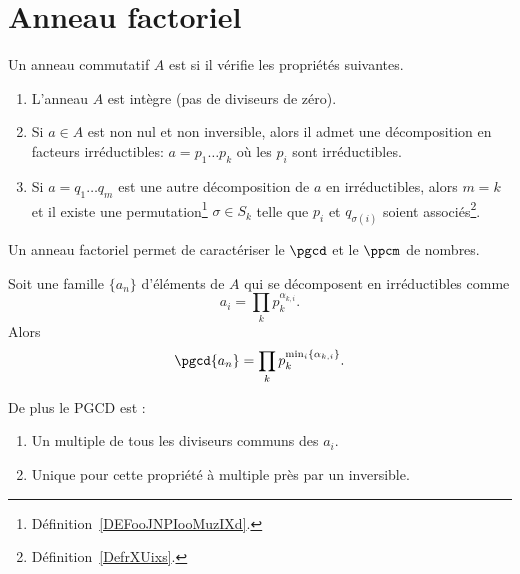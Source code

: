 \section{Anneau factoriel}

\begin{definition}        \label{DEFooVCATooPJGWKq}
	Un anneau commutatif \( A\) est  si il vérifie les propriétés suivantes.
	\begin{enumerate}
		\item
		      L'anneau \( A\) est intègre (pas de diviseurs de zéro).
		\item
		      Si \( a\in A\) est non nul et non inversible, alors il admet une décomposition en facteurs irréductibles: \( a=p_1\ldots p_k\) où les \( p_i\) sont irréductibles.
		\item
		      Si \( a=q_1\ldots q_m\) est une autre décomposition de \( a\) en irréductibles, alors \( m=k\) et il existe une permutation\footnote{Définition~\ref{DEFooJNPIooMuzIXd}.} \( \sigma\in S_k\) telle que \( p_i\) et \( q_{\sigma(i)}\) soient associés\footnote{Définition~\ref{DefrXUixs}.}.
	\end{enumerate}
\end{definition}

Un anneau factoriel permet de caractériser le \( \pgcd\) et le \( \ppcm\) de nombres.

\begin{proposition}
	Soit une famille \( \{ a_n \}\) d'éléments de \( A\) qui se décomposent en irréductibles comme
	\begin{equation}
		a_i=\prod_k p_k^{\alpha_{k,i}}.
	\end{equation}
	Alors
	\begin{equation}
		\pgcd\{ a_n \}=\prod_k p_k^{\min_i\{ \alpha_{k,i} \}}.
	\end{equation}

	De plus le PGCD est :
	\begin{enumerate}
		\item
		      Un multiple de tous les diviseurs communs des \( a_i\).
		\item
		      Unique pour cette propriété à multiple près par un inversible.
	\end{enumerate}
\end{proposition}

